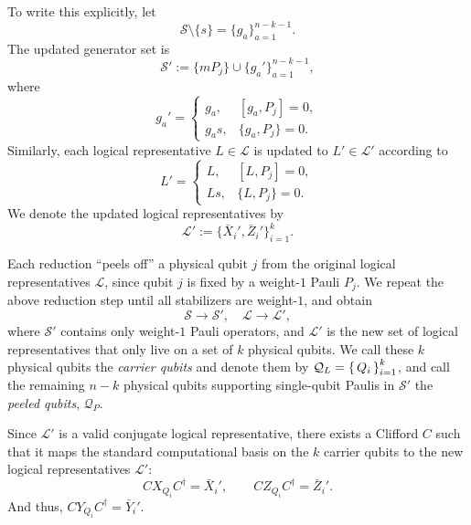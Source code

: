 To write this explicitly, let
\begin{equation}
\mathcal{S} \setminus \{ s \} = \{ g_a \}_{a=1}^{n-k-1} .
\label{eq:tomas-step-other-stabilizers}
\end{equation}
The updated generator set is
\begin{equation}
\mathcal{S}' := \{ m P_j \} \cup \{ g_a' \}_{a=1}^{n-k-1},
\label{eq:tomas-step-stabilizer-set}
\end{equation}
where
\begin{equation}
g_a' =
\begin{cases}
g_a, & [g_a, P_j] = 0, \\[3pt]
g_a s, & \{ g_a, P_j \} = 0 .
\end{cases}
\label{eq:tomas-step-stabilizer-update}
\end{equation}
Similarly, each logical representative $L \in \mathcal{L}$ is updated to
$L' \in \mathcal{L}'$ according to
\begin{equation}
L' =
\begin{cases}
L, & [L, P_j] = 0, \\[3pt]
L s, & \{ L, P_j \} = 0 .
\end{cases}
\label{eq:tomas-step-logical-update}
\end{equation}
We denote the updated logical representatives by
\begin{equation}
\mathcal{L}' := \{ \bar{X}_i', \bar{Z}_i' \}_{i=1}^{k}.
\label{eq:tomas-step-updated-logical-basis}
\end{equation}

Each reduction ``peels off'' a physical qubit $j$ from the original logical representatives $\mathcal{L}$, since qubit $j$ is fixed by a weight-$1$ Pauli $P_j$.
We repeat the above reduction step
until all stabilizers are weight-$1$, and obtain
\begin{equation}
\mathcal{S} \to \mathcal{S}', \quad
\mathcal{L} \to \mathcal{L}',
\end{equation}
where $ \mathcal{S}' $ contains only weight-$1$ Pauli operators,
and $ \mathcal{L}' $ is the new set of logical representatives that only live on a set of $ k $ physical qubits. 
We call these $ k $ physical qubits the \emph{carrier qubits} and denote them by $\mathcal{Q}_L = \set{Q_i}_{i=1}^k$, and call the remaining $ n-k $ physical qubits supporting single-qubit Paulis in $ \mathcal{S}' $ the \emph{peeled qubits}, $\mathcal{Q}_P$.

Since $ \mathcal{L}' $ is a valid conjugate logical representative,
there exists a Clifford $C$ such that it maps the standard computational basis on the $ k $ carrier qubits to the new logical representatives $\mathcal{L}'$:
\begin{equation}
C X_{Q_i} C^\dagger = \bar{X}_i',
\qquad
C Z_{Q_i} C^\dagger = \bar{Z}_i'.
\end{equation}
And thus, $C Y_{Q_i} C^\dagger = \bar{Y}_i'$.

